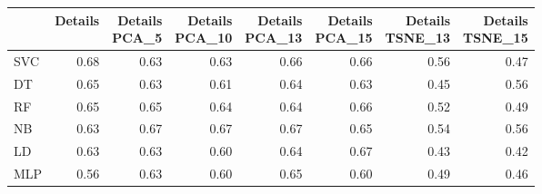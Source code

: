 \documentclass[12pt,italian]{report}
\begin{document}
\begin{table}[h]
	\begin{center}
		\begin{adjustbox}{max width=\textwidth, max totalheight= {4cm}}
			\begin{tabular}{lrrrrrrr}
				\toprule
				{} &   Details &  \thead{Details\\PCA\_5} &  \thead{Details\\PCA\_10} &  \thead{Details\\PCA\_13} &  \thead{Details\\PCA\_15} &  \thead{Details\\TSNE\_13} &  \thead{Details\\TSNE\_15} \\
				\midrule
				SVC &  0.68 &                  0.63 &                   0.63 &                   0.66 &                   0.66 &                    0.56 &                    0.47 \\
				DT  &  \cellcolor{cyan}0.65 &                  0.63 &                   0.61 &                   0.64 &                   0.63 &                    0.45 &                    0.56 \\
				RF  &  0.65 &                  0.65 &                   0.64 &                   0.64 &                   \cellcolor{cyan}0.66 &                    0.52 &                    0.49 \\
				NB  &  0.63 &                  0.67 &                   0.67 &                   0.67 &                   0.65 &                    0.54 &                    0.56 \\
				LD  &  0.63 &                  0.63 &                   0.60 &                   0.64 &                   0.67 &                    0.43 &                    0.42 \\
				MLP &  0.56 &                  0.63 &                   0.60 &                   0.65 &                   0.60 &                    0.49 &                    0.46 \\
				\bottomrule
			\end{tabular}
		\end{adjustbox}
	\end{center}
\end{table}
\end{document}
